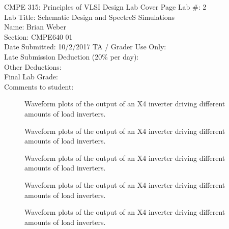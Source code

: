 \documentclass[10pt]{article}
\begin{document}
\begin{titlepage}
\centering
\huge{CMPE 315: Principles of VLSI Design Lab Cover Page}
\vfill
\flushleft
\large{
Lab \#: 2\\
Lab Title: Schematic Design and SpectreS Simulations\\}
\vfill
Name: Brian Weber\\
Section: CMPE640 01\\
\vfill
Date Submitted: 10/2/2017
\vfill
\Large{TA / Grader Use Only:}\\
Late Submission Deduction (20\% per day):\\
\vspace{1cm}
Other Deductions:\\
\vspace{3cm}
Final Lab Grade:\\
\vspace{1cm}
Comments to student:\\
\vspace{5cm}
\end{titlepage}
\tableofcontents
\begin{figure}[htb]
    \centering
    \begingroup
    \fontsize{8pt}{8pt}\selectfont
    
    \endgroup
    \caption{Waveform plots of the output of an X4 inverter driving different amounts of load inverters.}
    \label{aoi_func}
\end{figure}
\begin{figure}[htb]
    \centering
    \begingroup
    \fontsize{8pt}{8pt}\selectfont
    
    \endgroup
    \caption{Waveform plots of the output of an X4 inverter driving different amounts of load inverters.}
    \label{oai_func}
\end{figure}
\begin{figure}[htb]
    \centering
    \begingroup
    \fontsize{8pt}{8pt}\selectfont
    
    \endgroup
    \caption{Waveform plots of the output of an X4 inverter driving different amounts of load inverters.}
    \label{nor}
\end{figure}
\begin{figure}[htb]
    \centering
    \begingroup
    \fontsize{8pt}{8pt}\selectfont
    
    \endgroup
    \caption{Waveform plots of the output of an X4 inverter driving different amounts of load inverters.}
    \label{nand}
\end{figure}
\begin{figure}[htb]
    \centering
    \begingroup
    \fontsize{8pt}{8pt}\selectfont
    
    \endgroup
    \caption{Waveform plots of the output of an X4 inverter driving different amounts of load inverters.}
    \label{oai}
\end{figure}
\end{document}
